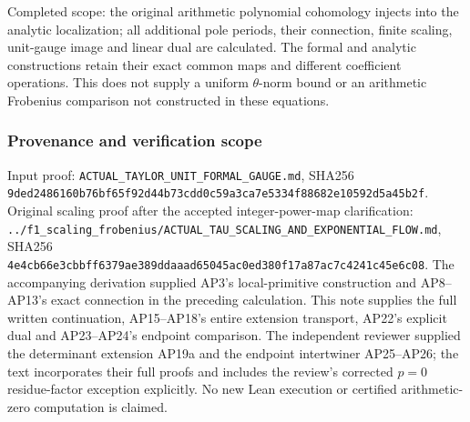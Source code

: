 Completed scope: the original arithmetic polynomial cohomology injects into the analytic localization; all additional pole periods, their connection, finite scaling, unit-gauge image and linear dual are calculated. The formal and analytic constructions retain their exact common maps and different coefficient operations. This does not supply a uniform \(\theta\)-norm bound or an arithmetic Frobenius comparison not constructed in these equations.

\subsubsection{Provenance and verification scope}\label{endpoint-analytic_pole--provenance-and-verification-scope}

Input proof: \nolinkurl{ACTUAL_TAYLOR_UNIT_FORMAL_GAUGE.md}, SHA256 \nolinkurl{9ded2486160b76bf65f92d44b73cdd0c59a3ca7e5334f88682e10592d5a45b2f}. Original scaling proof after the accepted integer-power-map clarification: \nolinkurl{../f1_scaling_frobenius/ACTUAL_TAU_SCALING_AND_EXPONENTIAL_FLOW.md}, SHA256 \nolinkurl{4e4cb66e3cbbff6379ae389ddaaad65045ac0ed380f17a87ac7c4241c45e6c08}. The accompanying derivation supplied AP3's local-primitive construction and AP8--AP13's exact connection in the preceding calculation. This note supplies the full written continuation, AP15--AP18's entire extension transport, AP22's explicit dual and AP23--AP24's endpoint comparison. The independent reviewer supplied the determinant extension AP19a and the endpoint intertwiner AP25--AP26; the text incorporates their full proofs and includes the review's corrected \(p=0\) residue-factor exception explicitly. No new Lean execution or certified arithmetic-zero computation is claimed.

\endgroup


\endgroup
